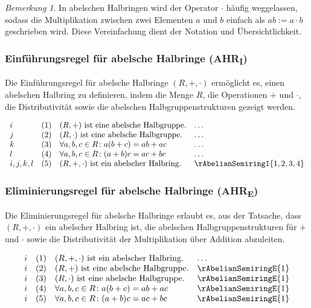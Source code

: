 \documentclass{book}
\theoremstyle{plain}
\theoremstyle{remark}
\newtheorem*{remark}{Bemerkung}
\theoremstyle{definition}
\begin{document}
\begin{remark}
    In abelschen Halbringen wird der Operator \(\cdot\) häufig weggelassen, sodass die Multiplikation zwischen zwei Elementen \(a\) und \(b\) einfach als \(ab := a \cdot b\) geschrieben wird. Diese Vereinfachung dient der Notation und Übersichtlichkeit.
\end{remark}

\subsubsection*{Einführungsregel für abelsche Halbringe (AHR\textsubscript{I})}
\label{rule:rAbelianSemiringI}
Die Einführungsregel für abelsche Halbringe \((R, +, \cdot)\) ermöglicht es, einen abelschen Halbring zu definieren, indem die Menge \(R\), die Operationen \(+\) und \(\cdot\), die Distributivität sowie die abelschen Halbgruppenstrukturen gezeigt werden.

\[
\begin{array}{llll}
    i       & (1) & (R, +) \text{ ist eine abelsche Halbgruppe.} & \dots \\
    j       & (2) & (R, \cdot) \text{ ist eine abelsche Halbgruppe.} & \dots \\
    k       & (3) & \forall a, b, c \in R \colon a(b + c) = ab + ac & \dots \\
    l       & (4) & \forall a, b, c \in R \colon (a + b)c = ac + bc & \dots \\
    i,j,k,l & (5) & (R, +, \cdot) \text{ ist ein abelscher Halbring.} & \rAbelianSemiringI{1,2,3,4}
\end{array}
\]

\subsubsection*{Eliminierungsregel für abelsche Halbringe (AHR\textsubscript{E})}
\label{rule:rAbelianSemiringE}
Die Eliminierungsregel für abelsche Halbringe erlaubt es, aus der Tatsache, dass \((R, +, \cdot)\) ein abelscher Halbring ist, die abelschen Halbgruppenstrukturen für \(+\) und \(\cdot\) sowie die Distributivität der Multiplikation über Addition abzuleiten.

\[
\begin{array}{llll}
    i       & (1) & (R, +, \cdot) \text{ ist ein abelscher Halbring.} & \dots \\
    i       & (2) & (R, +) \text{ ist eine abelsche Halbgruppe.} & \rAbelianSemiringE{1} \\
    i       & (3) & (R, \cdot) \text{ ist eine abelsche Halbgruppe.} & \rAbelianSemiringE{1} \\
    i       & (4) & \forall a, b, c \in R \colon a(b + c) = ab + ac & \rAbelianSemiringE{1} \\
    i       & (5) & \forall a, b, c \in R \colon (a + b)c = ac + bc & \rAbelianSemiringE{1}
\end{array}
\]
\end{document}
